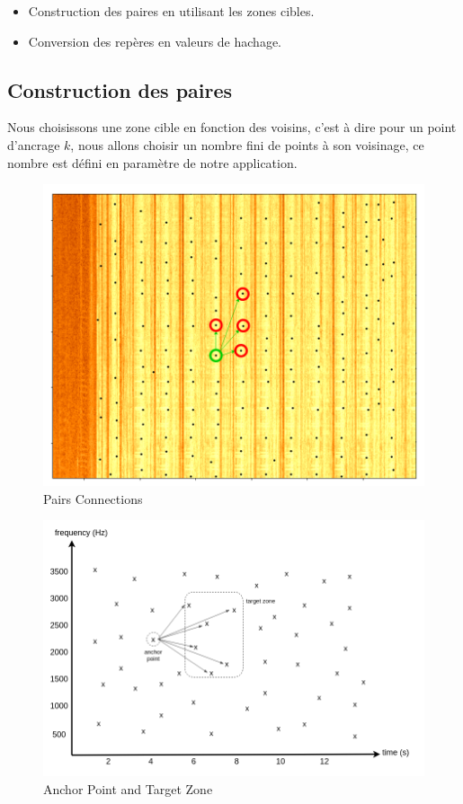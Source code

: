 \documentclass[11pt, report, french]{scrreprt}
\begin{document}
\begin{itemize}
	\item Construction des paires en utilisant les zones cibles.
	\item Conversion des repères en valeurs de hachage.
\end{itemize}	

\subsection{Construction des paires}
Nous choisissons une zone cible en fonction des voisins, c'est à dire pour un point d'ancrage $k$, nous allons choisir un nombre fini de points à son voisinage, ce nombre est défini en paramètre de notre application.

\begin{figure}[H]
	\centering
	\includegraphics[scale=0.3]{img/pairs.png}
	\caption{Pairs Connections}
\end{figure}

\begin{figure}[H]
	\centering
	\includegraphics[scale=0.45]{img/anchor_point.png}
	\caption{Anchor Point and Target Zone}
\end{figure}
\end{document}
